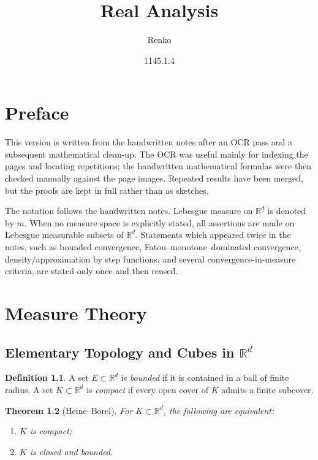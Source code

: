 \documentclass[11pt,openany]{book}
\title{Real Analysis}
\author{Renko}
\date{1145.1.4}
\numberwithin{equation}{chapter}
\theoremstyle{definition}
\newtheorem{definition}{Definition}[chapter]
\theoremstyle{plain}
\newtheorem{theorem}[definition]{Theorem}
\theoremstyle{remark}
\newcommand{\R}{\mathbb{R}}
\newcommand{\1}{\mathbf{1}}
\begin{document}
\maketitle
\tableofcontents

\chapter*{Preface}
This version is written from the handwritten notes after an OCR pass and a subsequent mathematical clean-up.  The OCR was useful mainly for indexing the pages and locating repetitions; the handwritten mathematical formulas were then checked manually against the page images.  Repeated results have been merged, but the proofs are kept in full rather than as sketches.

The notation follows the handwritten notes.  Lebesgue measure on \(\R^d\) is denoted by \(m\).  When no measure space is explicitly stated, all assertions are made on Lebesgue measurable subsets of \(\R^d\).  Statements which appeared twice in the notes, such as bounded convergence, Fatou--monotone--dominated convergence, density/approximation by step functions, and several convergence-in-measure criteria, are stated only once and then reused.

\chapter{Measure Theory}

\section{Elementary Topology and Cubes in \texorpdfstring{$\R^d$}{Rd}}

\begin{definition}
A set \(E\subset\R^d\) is \emph{bounded} if it is contained in a ball of finite radius.  A set \(K\subset\R^d\) is \emph{compact} if every open cover of \(K\) admits a finite subcover.
\end{definition}

\begin{theorem}[Heine--Borel]
For \(K\subset\R^d\), the following are equivalent:
\begin{enumerate}[label=(\roman*)]
    \item \(K\) is compact;
    \item \(K\) is closed and bounded.
\end{enumerate}
\end{theorem}
\end{document}
